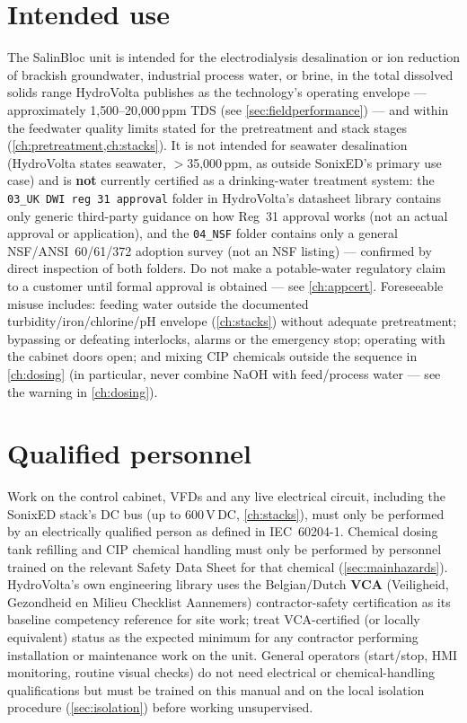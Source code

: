 \documentclass[a4paper,11pt,twoside,openright,numbers=noenddot]{scrreprt}
\newcommand{\salinbloc}{SalinBloc\texttrademark\xspace}
\newcommand{\sonixed}{SonixED\texttrademark\xspace}
\begin{document}
\section{Intended use}
\label{sec:intendeduse}
The \salinbloc unit is intended for the electrodialysis desalination or ion
reduction of brackish groundwater, industrial process water, or brine, in
the total dissolved solids range HydroVolta publishes as the technology's
operating envelope --- approximately 1{,}500--20{,}000\,ppm TDS (see
\cref{sec:fieldperformance}) --- and within the feedwater quality limits
stated for the pretreatment and stack stages
(\cref{ch:pretreatment,ch:stacks}). It is not intended for seawater
desalination (HydroVolta states seawater, $>$35{,}000\,ppm, as outside
\sonixed's primary use case) and is \textbf{not} currently certified as a
drinking-water treatment system: the \texttt{03\_UK DWI reg~31 approval}
folder in HydroVolta's datasheet library contains only generic
third-party guidance on how Reg~31 approval works (not an actual approval
or application), and the \texttt{04\_NSF} folder contains only a general
NSF/ANSI~60/61/372 adoption survey (not an NSF listing) --- confirmed by
direct inspection of both folders. Do not make a potable-water regulatory
claim to a customer until formal approval is obtained --- see
\cref{ch:appcert}. Foreseeable misuse includes: feeding
water outside the documented turbidity/iron/chlorine/pH envelope
(\cref{ch:stacks}) without adequate pretreatment; bypassing or defeating
interlocks, alarms or the emergency stop; operating with the cabinet doors
open; and mixing CIP chemicals outside the sequence in
\cref{ch:dosing} (in particular, never combine NaOH with feed/process
water --- see the warning in \cref{ch:dosing}).

\section{Qualified personnel}
Work on the control cabinet, VFDs and any live electrical circuit,
including the \sonixed stack's DC bus (up to 600\,V\,DC,
\cref{ch:stacks}), must only be performed by an electrically qualified
person as defined in IEC~60204-1. Chemical dosing tank refilling and CIP
chemical handling must only be performed by personnel trained on the
relevant Safety Data Sheet for that chemical (\cref{sec:mainhazards}).
HydroVolta's own engineering library uses the Belgian/Dutch \textbf{VCA}
(Veiligheid, Gezondheid en Milieu Checklist Aannemers) contractor-safety
certification as its baseline competency reference for site work; treat
VCA-certified (or locally equivalent) status as the expected minimum for
any contractor performing installation or maintenance work on the unit.
General operators (start/stop, HMI monitoring, routine visual checks) do
not need electrical or chemical-handling qualifications but must be
trained on this manual and on the local isolation procedure
(\cref{sec:isolation}) before working unsupervised.
\end{document}
